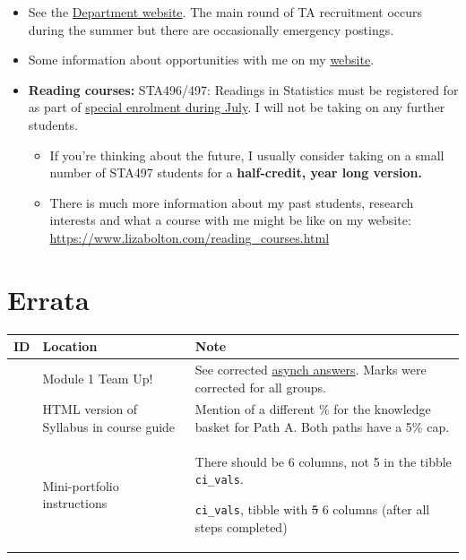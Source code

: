 \documentclass[
  openany]{book}
\begin{document}
\begin{itemize}
\item
  See the \href{https://www.statistics.utoronto.ca/employment-opportunities/cupe-positions-unit-1}{Department website}. The main round of TA recruitment occurs during the summer but there are occasionally emergency postings.
\item
  Some information about opportunities with me on my \href{https://www.lizabolton.com/opportunities.html}{website}.
\item
  \textbf{Reading courses:} STA496/497: Readings in Statistics must be registered for as part of \href{https://utoronto.sharepoint.com/sites/ArtSci-STA/Undergrad/SitePages/Special-Enrolment-Courses--STA490Y1,-STA492H1-and-STA496H1-STA497H1.aspx}{special enrolment during July}. I will not be taking on any further students.

  \begin{itemize}
  \item
    If you're thinking about the future, I usually consider taking on a small number of STA497 students for a \textbf{half-credit, year long version.}
  \item
    There is much more information about my past students, research interests and what a course with me might be like on my website: \url{https://www.lizabolton.com/reading_courses.html}
  \end{itemize}
\end{itemize}

\hypertarget{errata}{%
\section{Errata}\label{errata}}

\begin{longtable}[]{@{}
  >{\raggedright\arraybackslash}p{}
  >{\raggedright\arraybackslash}p{}
  >{\raggedright\arraybackslash}p{}@{}}
\toprule
ID & Location & Note \\
\midrule
\endhead
1 & Module 1 Team Up! & See corrected \href{https://jupyter.utoronto.ca/hub/user-redirect/git-pull?repo=https\%3A\%2F\%2Fgithub.com\%2Fsta303-bolton\%2Fsta303-w22-activities\&urlpath=shiny\%2Fsta303-w22-activities\%2Finst\%2Ftutorials\%2Fsta303_m1_teamup_asynch\%2FSTA303_m1_teamup_synch.Rmd\&branch=master}{asynch answers}. Marks were corrected for all groups. \\
2 & HTML version of Syllabus in course guide & Mention of a different \% for the knowledge basket for Path A. Both paths have a 5\% cap. \\
3 & Mini-portfolio instructions & There should be 6 columns, not 5 in the tibble \texttt{ci\_vals}.

\texttt{ci\_vals}, tibble with \sout{5} 6 columns (after all steps completed) \\
\bottomrule
\end{longtable}
\end{document}
